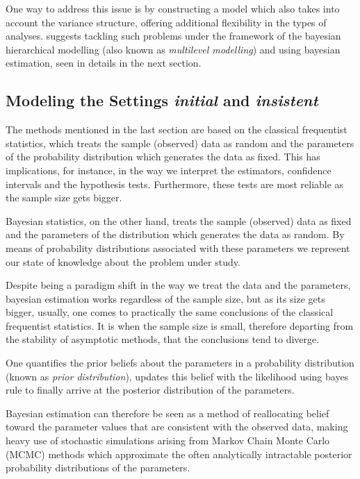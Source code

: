 \documentclass[11pt]{article}
\begin{document}
One way to address this issue is by constructing a model which also takes into account the variance structure, offering additional flexibility in the types of analyses.   suggests tackling such problems under the framework of the bayesian hierarchical modelling (also known as \textit{multilevel modelling}) and using bayesian estimation, seen in details in the next section.


\subsection{Modeling the Settings {\it{initial}} and {\it{insistent}}}

The methods mentioned in the last section are based on the classical frequentist statistics, which treats the sample (observed) data as random and the parameters of the probability distribution which generates the data as fixed. This has implications, for instance, in the way we interpret the estimators, confidence intervals and the hypothesis tests. Furthermore, these tests are most reliable as the sample size gets bigger.

Bayesian statistics, on the other hand, treats the sample (observed) data as fixed and the parameters of the distribution which generates the data as random. By means of probability distributions associated with these parameters we represent our state of knowledge about the problem under study. 

Despite being a paradigm shift in the way we treat the data and the parameters, bayesian estimation works regardless of the sample size, but as its size gets bigger, usually, one comes to practically the same conclusions of the classical frequentist statistics. It is when the sample size is small, therefore departing from the stability of asymptotic methods, that the conclusions tend to diverge.

One quantifies the prior beliefs about the parameters in a probability distribution (known as \textit{prior distribution}), updates this belief with the likelihood using bayes rule to finally arrive at the posterior distribution of the parameters. 

Bayesian estimation can therefore be seen as a method of reallocating belief toward the parameter values that are consistent with the observed data, making heavy use of stochastic simulations arising from Markov Chain Monte Carlo (MCMC) methods which approximate the often analytically intractable posterior probability distributions of the parameters.
\end{document}
